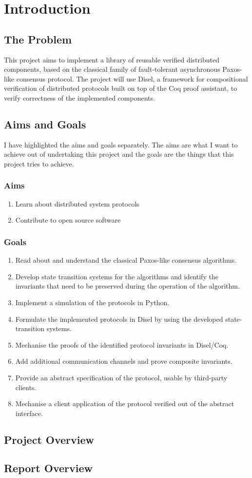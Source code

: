 \chapter{Introduction}

\section{The Problem}
This project aims to implement a library of reusable verified distributed components,
based on the classical family of fault-tolerant asynchronous Paxos-like consensus protocol.
The project will use Disel, a framework for compositional verification of distributed
protocols built on top of the Coq proof assistant, to verify correctness of the
implemented components.

\section{Aims and Goals}
I have highlighted the aims and goals separately. The aims are what I want to
achieve out of undertaking this project and the goals are the things that this
project tries to achieve.

\subsection{Aims}
\begin{enumerate}
  \item Learn about distributed system protocols
  \item Contribute to open source software
\end{enumerate}

\vspace{-5mm}
\subsection{Goals}
\begin{enumerate}
  \item Read about and understand the classical Paxos-like consensus algorithms.
  \item Develop state transition systems for the algorithms and identify the invariants that need to be preserved during the operation of the algorithm.
  \item Implement a simulation of the protocols in Python.
  \item Formulate the implemented protocols in Disel by using the developed state-transition systems.
  \item Mechanise the proofs of the identified protocol invariants in Disel/Coq.
  \item Add additional communication channels and prove composite invariants.
  \item Provide an abstract specification of the protocol, usable by third-party clients.
  \item Mechanise a client application of the protocol verified out of the abstract interface.
\end{enumerate}

\vspace{-4mm}
\section{Project Overview}

\section{Report Overview}
